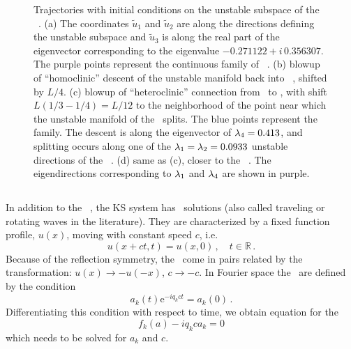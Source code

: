 {\begin{figure}[t]
\begin{center}
\end{center}
\caption{
 Trajectories with initial conditions on the unstable subspace of
 the ~\eqv.
 (a) The coordinates $\tilde{u}_1$ and $\tilde{u}_2$
 are along the directions defining the unstable subspace
 and $\tilde{u}_3$  is along the real part of the eigenvector
 corresponding to the eigenvalue $-0.271122+ i\, 0.356307$.
The purple points represent the continuous family
 of
~\eqva.
(b) blowup of ``homoclinic'' descent of the unstable manifold
back into ~\eqv, shifted by
$L/4$.
(c) blowup of ``heteroclinic'' connection from
 \eqv\ to  \eqv, with shift
$L(1/3-1/4) = L/12$
to the neighborhood of the point near which the
unstable manifold of the
 \eqv\ splits. The blue points
represent the
 {\eqv} family.
The descent is along the eigenvector of $\lambda_4= 0.413$,
and splitting
occurs along one of the
$\lambda_1=\lambda_2=0.0933$
unstable directions of the ~{\eqv}.
(d) same as (c), closer to the ~{\eqv}.
The eigendirections corresponding to $\lambda_1$
and $\lambda_4$ are shown in purple.
}
\end{figure}

\subsection{\Reqva}

In addition to the \eqva\ , the KS system has \reqv\ solutions
(also called traveling or rotating waves in the literature).
They are characterized by a fixed function profile, $u(x)$,
moving with constant speed $c$, i.e.
\[ u(x+ct,t) = u(x, 0)\,,\quad t \in \mathbb{R}\,.\]
Because of the reflection symmetry, the \reqva\ come in pairs
related by the transformation: $u(x) \to -u(-x)$, $c \to -c$.
In Fourier space the \reqva\ are defined by the condition
\[ a_k(t)\mathrm{e}^{-iq_kct} = a_k(0)\,.\]
Differentiating this condition with respect to time, we obtain
equation for the \reqv\
\[ f_k(a) - i q_k c a_k = 0 \]
which needs to be solved for $a_k$ and $c$.

}
